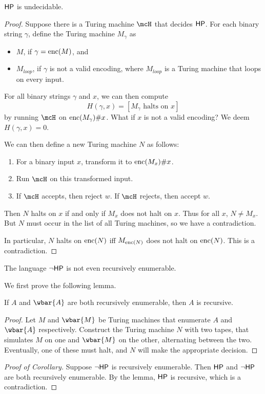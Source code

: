 \begin{theorem*}
    $\mathsf{HP}$ is undecidable.
\end{theorem*}
\begin{proof}
    Suppose there is a Turing machine $\mcH$ that decides $\mathsf{HP}$.
    For each binary string $\gamma$, define the Turing machine $M_\gamma$ as
    \begin{itemize}
        \item $M$, if $\gamma = \operatorname{enc}(M)$, and
        \item $M_{loop}$, if $\gamma$ is not a valid encoding,
        where $M_{loop}$ is a Turing machine that loops on every input.
    \end{itemize}

    For all binary strings $\gamma$ and $x$, we can then compute \[
        H(\gamma, x) = [M_\gamma \text{ halts on } x]
    \] by running $\mcH$ on $\operatorname{enc}(M_\gamma)\#x$.
    What if $x$ is not a valid encoding? We deem $H(\gamma, x) = 0$.

    We can then define a new Turing machine $N$ as follows:
    \begin{enumerate}
        \item For a binary input $x$, transform it to $\operatorname{enc}(M_x)\#x$.
        \item Run $\mcH$ on this transformed input.
        \item If $\mcH$ accepts, then reject $w$.
            If $\mcH$ rejects, then accept $w$.
    \end{enumerate}

    Then $N$ halts on $x$ if and only if $M_x$ does not halt on $x$.
    Thus for all $x$, $N \ne M_x$.
    But $N$ must occur in the list of all Turing machines, so we have a
    contradiction.

    In particular, $N$ halts on $\operatorname{enc}(N)$ iff $M_{\operatorname{enc}(N)}$
    does not halt on $\operatorname{enc}(N)$.
    This is a contradiction.
\end{proof}

\begin{corollary*}
    The language $\neg\mathsf{HP}$ is not even recursively enumerable.
\end{corollary*}
We first prove the following lemma.
\begin{lemma}
    If $A$ and $\wbar{A}$ are both recursively enumerable, then $A$ is
    recursive.
\end{lemma}
\begin{proof}
    Let $M$ and $\wbar{M}$ be Turing machines that enumerate $A$ and
    $\wbar{A}$ respectively.
    Construct the Turing machine $N$ with two tapes, that simulates $M$ on
    one and $\wbar{M}$ on the other, alternating between the two.
    Eventually, one of these must halt, and $N$ will make the appropriate
    decision.
\end{proof}

\begin{proof}[Proof of Corollary]
    Suppose $\neg\mathsf{HP}$ is recursively enumerable.
    Then $\mathsf{HP}$ and $\neg\mathsf{HP}$ are both recursively enumerable.
    By the lemma, $\mathsf{HP}$ is recursive, which is a contradiction.
\end{proof}
